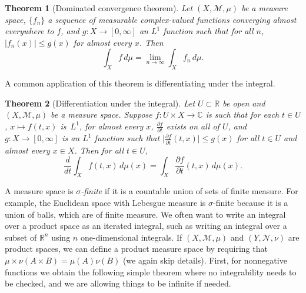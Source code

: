 \documentclass[12pt,openany]{book}
\newcommand{\sabs}[1]{\lvert {#1} \rvert}
\newcommand{\babs}[1]{\bigl\lvert {#1} \bigr\rvert}
\newcommand{\C}{{\mathbb{C}}}
\newcommand{\R}{{\mathbb{R}}}
\newcommand{\sM}{{\mathscr{M}}}
\newcommand{\sN}{{\mathscr{N}}}
\theoremstyle{plain}
\newtheorem{thm}{Theorem}[section]
\theoremstyle{remark}
\theoremstyle{definition}
\theoremstyle{exercise}
\theoremstyle{example}
\begin{document}
\begin{thm}[Dominated convergence theorem]
\pagebreak[2]
Let $(X,\sM,\mu)$ be a measure space,
$\{ f_n \}$ a sequence of measurable complex-valued functions converging
almost everywhere to $f$, and $g \colon X \to [0,\infty]$ an
$L^1$ function such that for all $n$, $\sabs{f_n(x)} \leq g(x)$ for almost every
$x$.  Then
\begin{equation*}
\int_X f \, d\mu = \lim_{n\to \infty} \int_X f_n \, d\mu .
\end{equation*}
\end{thm}

A common application of this theorem is differentiating
under the integral.

\begin{thm}[Differentiation under the integral]
Let $U \subset \R$ be open and $(X,\sM,\mu)$ be a measure space.
Suppose $f \colon U \times X \to \C$ is such that
for each $t \in U$, $x \mapsto f(t,x)$ is~$L^1$,
for almost every $x$, $\frac{\partial f}{\partial t}$ exists on all of $U$,
and $g \colon X \to [0,\infty]$ is an $L^1$ function such that
$\babs{\frac{\partial f}{\partial t}(t,x)} \leq g(x)$ for all $t \in U$
and almost every $x \in X$.  Then for all $t \in U$,
\begin{equation*}
\frac{d}{dt}
\int_X f(t,x) \, d\mu(x)
=
\int_X
\frac{\partial f}{\partial t}(t,x) \, d\mu(x) .
\end{equation*}
\end{thm}

A measure space is \emph{$\sigma$-finite}
if it is a countable union of sets of
finite measure.  For example, the Euclidean space with Lebesgue measure
is $\sigma$-finite because it is a union of balls, which are of finite
measure.  We often want to write an integral over a product space as an
iterated integral, such as writing an integral over a subset of $\R^n$ using
$n$ one-dimensional integrals.  If
$(X,\sM,\mu)$ and $(Y,\sN,\nu)$ are product spaces, we can define a product
measure space by requiring that $\mu \times \nu (A \times B) = \mu(A)\nu(B)$
(we again skip details).  First, for nonnegative functions we obtain the
following simple theorem where no integrability needs to be checked, and we
are allowing things to be infinite if needed.
\end{document}
